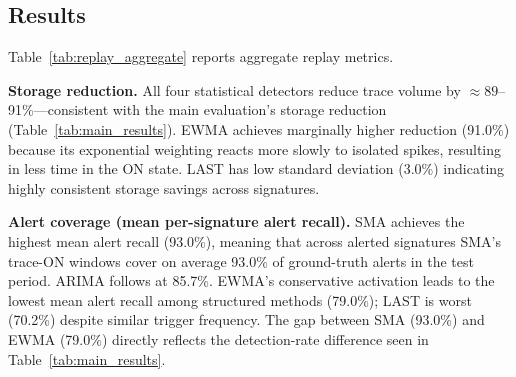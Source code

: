 \documentclass[pdflatex,sn-nature]{sn-jnl}
\theoremstyle{thmstyleone}%
\begin{document}
\subsection{Results}\label{sec:replay:results}

Table~\ref{tab:replay_aggregate} reports aggregate replay metrics.

\begin{table}[tbp]
\centering
{}
\caption{Trace-on replay aggregate metrics across 214 signatures
  for the four statistical detectors.
  136 of 214 signatures have $\geq 1$ alert in the test set.
  Best storage reduction in bold; best coverage in bold.}
\label{tab:replay_aggregate}
\end{table}

\textbf{Storage reduction.}
All four statistical detectors reduce trace volume by $\approx 89$--91\%---consistent with
the main evaluation's storage reduction (Table~\ref{tab:main_results}).
EWMA achieves marginally higher reduction (91.0\%) because its exponential
weighting reacts more slowly to isolated spikes, resulting in less time in the
ON state.
LAST has low standard deviation (3.0\%) indicating highly consistent storage
savings across signatures.

\textbf{Alert coverage (mean per-signature alert recall).}
SMA achieves the highest mean alert recall (93.0\%), meaning that across
alerted signatures SMA's trace-ON windows cover on average 93.0\% of
ground-truth alerts in the test period.
ARIMA follows at 85.7\%.
EWMA's conservative activation leads to the lowest mean alert recall among
structured methods (79.0\%); LAST is worst (70.2\%) despite similar trigger
frequency.
The gap between SMA (93.0\%) and EWMA (79.0\%) directly reflects the
detection-rate difference seen in Table~\ref{tab:main_results}.
\end{document}
